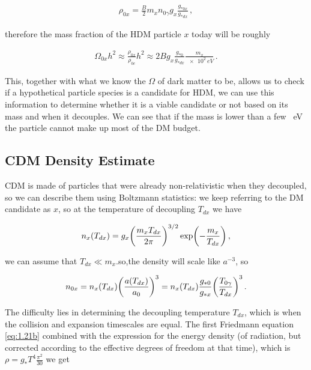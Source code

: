 \begin{align}
  \rho_{0x} = \frac{B}{2} m_x n_{0 \gamma } g_x \frac{g_{*0x}}{g_{*dx}}
\,,
\end{align}

therefore the mass fraction of the HDM particle \(x\) today will be roughly

\begin{align}
    \Omega_{0x} h^2 \approx \frac{\rho_{0x}}{\rho_{0c}} h^2 \approx 2B g_x \frac{g_{*0}}{g_{*dx}} \frac{m_x}{\SI{e2}{eV}}\,.
\end{align}

\hspace{0.5cm}This, together with what we know the \(\Omega\) of dark matter to be, allows us to check if a hypothetical particle species is a candidate for HDM, we can use this information to determine whether it is a viable candidate or not based on its mass and when it decouples.
We can see that if the mass is lower than a few \SI{}{eV} the particle cannot make up most of the DM budget.
 


\subsection{CDM Density Estimate}

\hspace{0.5cm}CDM is made of particles that were already non-relativistic when they decoupled, so we can describe them using Boltzmann statistics: we keep referring to the DM candidate as \(x\), so at the temperature of decoupling \(T_{dx}\) we have

\begin{align}
    n_x (T_{dx}) = g_{x} \qty(\frac{m_x T_{dx}}{2 \pi })^{3/2} \exp(- \frac{m_x}{T_{dx}}) \,,
\end{align}

\hspace{0.5cm}we can assume that \(T_{dx} \ll m_x\).so,the density will scale like \(a^{-3}\), so 

\begin{align}
      n_{0x} = n_x (T_{dx}) \qty(\frac{a(T_{dx})}{a_0 })^3 = n_x(T_{dx}) \frac{g_{*0}}{g_{*x}} \qty(\frac{T_{0 \gamma }}{T_{dx}})^3 \,.
\end{align}

The difficulty lies in determining the decoupling temperature \(T_{dx}\), which is when the collision and expansion timescales are equal. The first Friedmann equation \ref{eq:1.21b} combined with the expression for the energy density (of radiation, but corrected according to the effective degrees of freedom at that time), which is \( \rho = g_* T^4\frac{\pi^2}{30}\) we get

